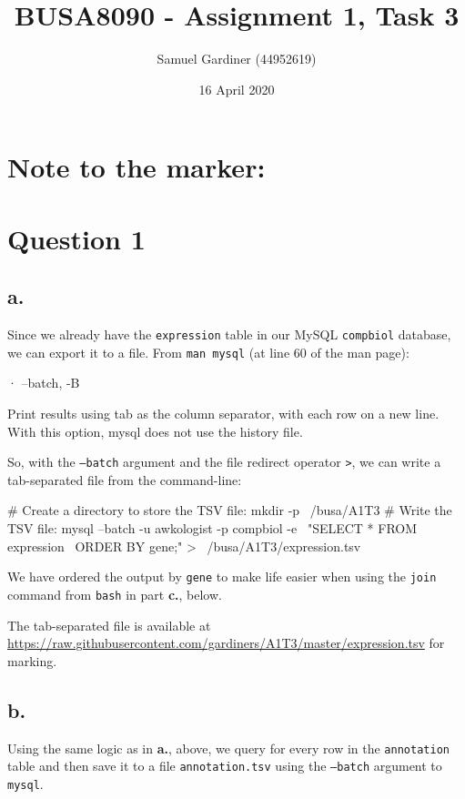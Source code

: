 \documentclass{article}
\title{BUSA8090 - Assignment 1, Task 3}
\author{Samuel Gardiner (44952619)}
\date{16 April 2020}
\begin{document}
\maketitle

\section{Note to the marker:}

\section{Question 1}

\subsection{a.}

Since we already have the \texttt{expression} table in our MySQL \texttt{compbiol} database, we can export it to a file. From \texttt{man mysql} (at line 60 of the man page):

\begin{bashinline}
   ·   --batch, -B

           Print results using tab as the column separator, with each row on a new line. With this option, mysql does not use the history file.
\end{bashinline}

So, with the \texttt{--batch} argument and the file redirect operator \texttt{>}, we can write a tab-separated file from the command-line:

\begin{bashcode}
# Create a directory to store the TSV file:
mkdir -p ~/busa/A1T3
# Write the TSV file:
mysql --batch -u awkologist -p compbiol -e \
"SELECT * FROM expression \
ORDER BY gene;" > ~/busa/A1T3/expression.tsv
\end{bashcode}

We have ordered the output by \texttt{gene} to make life easier when using the \texttt{join} command from \texttt{bash} in part \textbf{c.}, below.

The tab-separated file is available at \url{https://raw.githubusercontent.com/gardiners/A1T3/master/expression.tsv} for marking.

\subsection{b.}

Using the same logic as in \textbf{a.}, above, we query for every row in the \texttt{annotation} table and then save it to a file \texttt{annotation.tsv} using the \texttt{--batch} argument to \texttt{mysql}.
\end{document}
